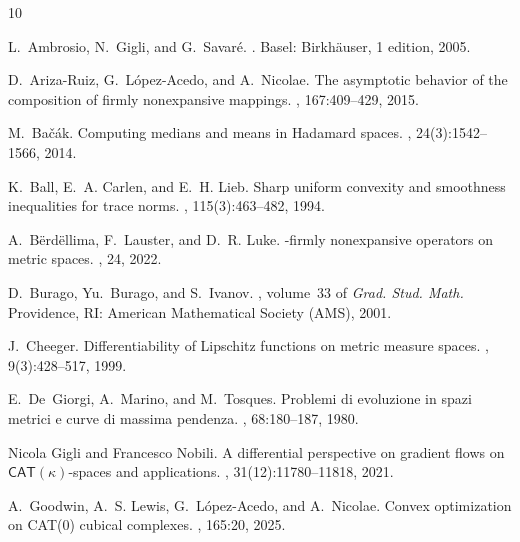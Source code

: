 \documentclass{article}
\theoremstyle{plain}\newtheorem{theorem}{Theorem}[section]
\theoremstyle{plain}\newtheorem{definition}[theorem]{Definition}
\theoremstyle{plain}\newtheorem{lemma}[theorem]{Lemma}
\theoremstyle{definition}\newtheorem{remark}[theorem]{Remark}
\theoremstyle{definition}\newtheorem{example}[theorem]{Example}
\theoremstyle{plain}\newtheorem{proposition}[theorem]{Proposition}
\theoremstyle{plain}\newtheorem{inference}[theorem]{Inference}
\theoremstyle{plain}\newtheorem{corollary}[theorem]{Corollary}
\theoremstyle{plain}\newtheorem{assumption}[theorem]{Assumption}
\begin{document}
% 
% 
\begin{thebibliography}{10}

L.~Ambrosio, N.~Gigli, and G.~Savar{\'e}.
.
\newblock Basel: Birkh\"auser, 1 edition, 2005.

D.~{Ariza-Ruiz}, G.~{L{\'o}pez-Acedo}, and A.~Nicolae.
\newblock The asymptotic behavior of the composition of firmly nonexpansive
  mappings.
, 167:409--429, 2015.

M.~Ba{\v c}{\'a}k.
\newblock Computing medians and means in {{Hadamard}} spaces.
, 24(3):1542--1566, 2014.

K.~Ball, E.~A. Carlen, and E.~H. Lieb.
\newblock Sharp uniform convexity and smoothness inequalities for trace norms.
, 115(3):463--482, 1994.

A.~B{\"e}rd{\"e}llima, F.~Lauster, and D.~R. Luke.
\newblock {{$\alpha$}}-firmly nonexpansive operators on metric spaces.
, 24, 2022.

D.~Burago, {\relax Yu}.~Burago, and S.~Ivanov.
, volume~33 of {\em Grad. {{Stud}}.
  {{Math}}.}
\newblock Providence, RI: American Mathematical Society (AMS), 2001.

J.~Cheeger.
\newblock Differentiability of {{Lipschitz}} functions on metric measure
  spaces.
, 9(3):428--517, 1999.

E.~De~Giorgi, A.~Marino, and M.~Tosques.
\newblock Problemi di evoluzione in spazi metrici e curve di massima pendenza.
, 68:180--187, 1980.

Nicola Gigli and Francesco Nobili.
\newblock A differential perspective on gradient flows on
  {{\(\mathbf{\mathsf{CAT}} (\kappa)\)}}-spaces and applications.
, 31(12):11780--11818, 2021.

A.~Goodwin, A.~S. Lewis, G.~{L{\'o}pez-Acedo}, and A.~Nicolae.
\newblock Convex optimization on {{CAT}}(0) cubical complexes.
, 165:20, 2025.


\end{thebibliography}
\end{document}
